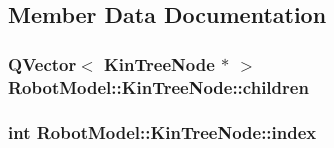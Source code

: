 \subsection{Member Data Documentation}
\hypertarget{class_robot_model_1_1_kin_tree_node_abf6a5c4792673635a7733ce24a749890}{
\subsubsection[{children}]{\setlength{\rightskip}{0pt plus 5cm}QVector$<$ {\bf KinTreeNode} $\ast$ $>$ {\bf RobotModel::KinTreeNode::children}}}
\label{class_robot_model_1_1_kin_tree_node_abf6a5c4792673635a7733ce24a749890}
\hypertarget{class_robot_model_1_1_kin_tree_node_ab7be97fae982037992b0971ab25e643a}{
\subsubsection[{index}]{\setlength{\rightskip}{0pt plus 5cm}int {\bf RobotModel::KinTreeNode::index}}}
\label{class_robot_model_1_1_kin_tree_node_ab7be97fae982037992b0971ab25e643a}


